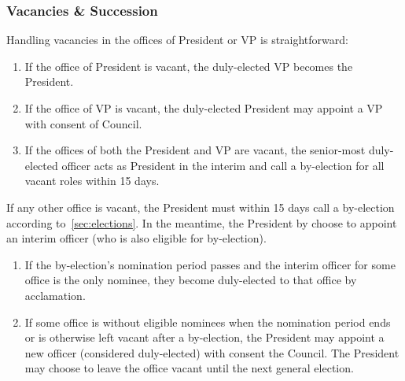 \subsubsection{Vacancies \& Succession}\label{sec:vacancy}
Handling vacancies in the offices of President or VP is straightforward:
\begin{enumerate}
      \item If the office of President is vacant, the duly-elected VP becomes the
            President.
      \item If the office of VP is vacant, the duly-elected President may appoint a VP with
            consent of Council.
      \item If the offices of both the President and VP are vacant, the senior-most
            duly-elected officer acts as President in the interim and call a by-election
            for all vacant roles within 15 days.
\end{enumerate}
If any other office is vacant, the President must within 15 days call a by-election according to~\ref{sec:elections}. In the meantime, the President by choose to appoint an interim officer (who is also eligible for by-election).

\begin{enumerate}
      \item If the by-election's nomination period passes and the interim officer for some
            office is the only nominee, they become duly-elected to that office by
            acclamation.
      \item If some office is without eligible nominees when the nomination period ends or
            is otherwise left vacant after a by-election, the President may appoint a new
            officer (considered duly-elected) with consent the Council. The President may
            choose to leave the office vacant until the next general election.
\end{enumerate}